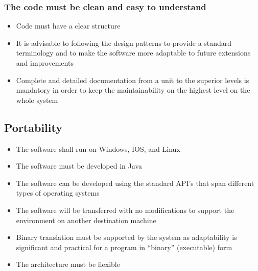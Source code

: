 \subsubsection{The code must be clean and easy to understand}
\begin{itemize}
  \item Code must have a clear structure
  \item It is advisable to following the design patterns to provide a standard terminology and to make the software more adaptable to future extensions and improvements
  \item Complete and detailed documentation from a unit to the superior levels is mandatory in order to keep the maintainability on the highest level on the whole system
\end{itemize}

\subsection{Portability}
\begin{itemize}
  \item The software shall run on Windows, IOS, and Linux
  \item The software must be developed in Java
  \item The software can be developed using the standard API’s that span different types of operating systems
  \item The software will be transferred with no modifications to support the environment on another destination machine
  \item Binary translation must be supported by the system as adaptability is significant and practical for a program in “binary” (executable) form
  \item The architecture must be flexible
\end{itemize}
